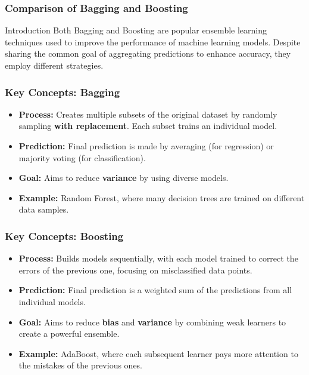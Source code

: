 \documentclass[aspectratio=169]{beamer}
\begin{document}
\begin{frame}[fragile]
    \frametitle{Comparison of Bagging and Boosting}
    \begin{block}{Introduction}
        Both Bagging and Boosting are popular ensemble learning techniques used to improve the performance of machine learning models. Despite sharing the common goal of aggregating predictions to enhance accuracy, they employ different strategies.
    \end{block}
\end{frame}

\begin{frame}[fragile]
    \frametitle{Key Concepts: Bagging}
    \begin{itemize}
        \item \textbf{Process:} Creates multiple subsets of the original dataset by randomly sampling \textbf{with replacement}. Each subset trains an individual model.
        \item \textbf{Prediction:} Final prediction is made by averaging (for regression) or majority voting (for classification).
        \item \textbf{Goal:} Aims to reduce \textbf{variance} by using diverse models.
        \item \textbf{Example:} Random Forest, where many decision trees are trained on different data samples.
    \end{itemize}
\end{frame}

\begin{frame}[fragile]
    \frametitle{Key Concepts: Boosting}
    \begin{itemize}
        \item \textbf{Process:} Builds models sequentially, with each model trained to correct the errors of the previous one, focusing on misclassified data points.
        \item \textbf{Prediction:} Final prediction is a weighted sum of the predictions from all individual models.
        \item \textbf{Goal:} Aims to reduce \textbf{bias} and \textbf{variance} by combining weak learners to create a powerful ensemble.
        \item \textbf{Example:} AdaBoost, where each subsequent learner pays more attention to the mistakes of the previous ones.
    \end{itemize}
\end{frame}
\end{document}
